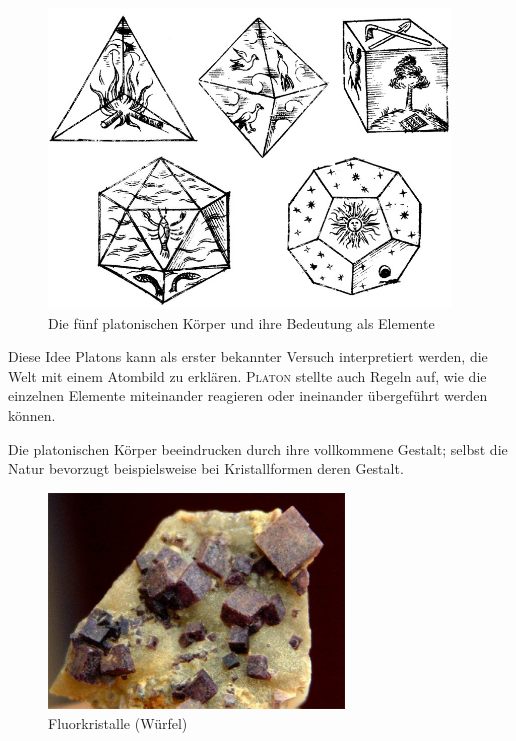 \documentclass[%
11pt,%
twoside,%
titlepage,%
a4page,%
german,%
headsepline%
]{scrartcl}
\begin{document}
\begin{figure}[h!]
\begin{center}
\includegraphics[width=0.95\textwidth]{pictures/platonkoerper}
\end{center}
\caption{Die f\"unf platonischen K\"orper und ihre Bedeutung als Elemente}
\end{figure}

Diese Idee Platons kann als erster bekannter Versuch interpretiert werden, die Welt mit einem Atombild zu erkl\"aren. \textsc{Platon} stellte auch Regeln auf, wie die einzelnen Elemente miteinander reagieren oder ineinander \"ubergef\"uhrt werden k\"onnen.

Die platonischen K\"orper beeindrucken durch ihre vollkommene Gestalt; selbst die Natur bevorzugt beispielsweise bei Kristallformen deren Gestalt.
\begin{figure}
\begin{center}
\includegraphics[width=0.7\textwidth]{pictures/kristallh}
\end{center}
\caption{Fluorkristalle (W\"urfel)}
\end{figure}
\end{document}
